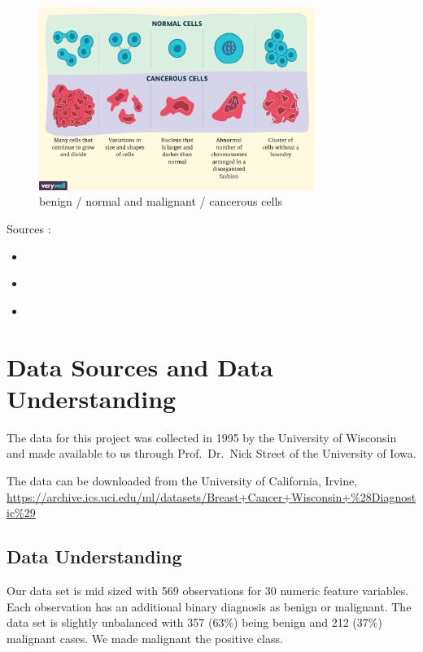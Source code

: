 \documentclass[]{article}
\begin{document}
\begin{figure}
    \centering
    \includegraphics[width=0.8\textwidth]{images/normal-vs-cancerous-cells.png}
    \caption{benign / normal and malignant / cancerous  cells}
    \label{fig:normal-vs-cancer}
\end{figure}

Sources :

\begin{itemize}
\item
  \cite{rki}
\item
  \cite{malignant-and-benign}
\item
  \cite{cancer-cells-vs-normal}
\end{itemize}

\section{Data Sources and Data
Understanding}\label{data-sources-and-data-understanding}

The data for this project was collected in 1995 by the University of
Wisconsin and made available to us through Prof.~Dr.~Nick Street of the
University of Iowa.

The data can be downloaded from the University of California, Irvine,
\url{https://archive.ics.uci.edu/ml/datasets/Breast+Cancer+Wisconsin+\%28Diagnostic\%29}

\subsection{Data Understanding}\label{data-understanding}

Our data set is mid sized with 569 observations for 30 numeric feature
variables. Each observation has an additional binary diagnosis as benign
or malignant. The data set is slightly unbalanced with 357 (63\%) being
benign and 212 (37\%) malignant cases. We made malignant the positive
class.
\end{document}

